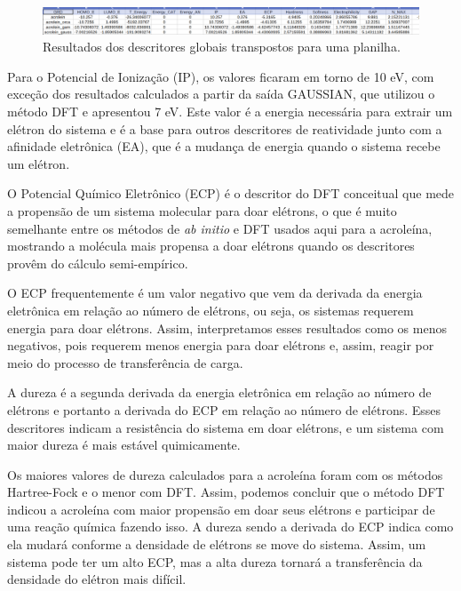 \documentclass[a4paper,11pt]{refart}
\begin{document}
\hspace*{-1.2\leftmarginwidth}
\begin{minipage}{\fullwidth}
	\begin{figure}[H]
		\begin{center}
			\includegraphics[width=7in]{images/img4}
			\caption{Resultados dos descritores globais transpostos para uma planilha.}
			\label{fig_tut1_3}
		\end{center}
	\end{figure}
\end{minipage}	

Para o Potencial de Ionização (IP), os valores ficaram em torno de 10 eV, com exceção dos resultados calculados a partir da saída GAUSSIAN, que utilizou o método DFT e apresentou 7 eV. Este valor é a energia necessária para extrair um elétron do sistema e é a base para outros descritores de reatividade junto com a afinidade eletrônica (EA), que é a mudança de energia quando o sistema recebe um elétron. 

O Potencial Químico Eletrônico (ECP) é o descritor do DFT conceitual que mede a propensão de um sistema molecular para doar elétrons, o que é muito semelhante entre os métodos de \textit{ab initio} e DFT usados aqui para a acroleína, mostrando a molécula mais propensa a doar elétrons quando os descritores provêm do cálculo semi-empírico.

O ECP frequentemente é um valor negativo que vem da derivada da energia eletrônica em relação ao número de elétrons, ou seja, os sistemas requerem energia para doar elétrons. Assim, interpretamos esses resultados como os menos negativos, pois requerem menos energia para doar elétrons e, assim, reagir por meio do processo de transferência de carga.

A dureza é a segunda derivada da energia eletrônica em relação ao número de elétrons e portanto a derivada do ECP em relação ao número de elétrons. Esses descritores indicam a resistência do sistema em doar elétrons, e um sistema com maior dureza é mais estável quimicamente. 

Os maiores valores de dureza calculados para a acroleína foram com os métodos Hartree-Fock e o menor com DFT. Assim, podemos concluir que o método DFT indicou a acroleína com maior propensão em doar seus elétrons e participar de uma reação química fazendo isso. A dureza sendo a derivada do ECP indica como ela mudará conforme a densidade de elétrons se move do sistema. Assim, um sistema pode ter um alto ECP, mas a alta dureza tornará a transferência da densidade do elétron mais difícil.
\end{document}
